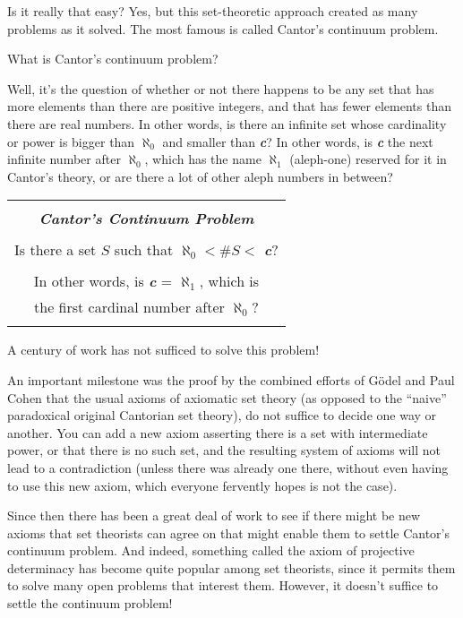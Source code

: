 \documentclass[12pt]{book}
\begin{document}
Is it really that easy?  Yes, but this set-theoretic approach 
created as many problems as it solved.  
The most famous is called Cantor's continuum problem.
 
What is Cantor's continuum problem?
 
Well, it's the question of whether or not there happens to be any set that has
more elements than there are positive integers, 
and that has fewer elements than there are real numbers.
In other words, is there an infinite set whose cardinality or power 
is bigger than $\aleph_0$ 
and smaller than \textbf{\emph{c}}?  In other words, is \textbf{\emph{c}} the next
infinite number after $\aleph_0$, which has the name 
$\aleph_1$
(aleph-one) reserved for it in Cantor's theory,
or are there a lot of other aleph numbers in between?
 
\begin{center}
\begin{tabular}{|c|}
\hline
\\
\textbf{\emph{\large Cantor's Continuum Problem}}
\\ \\
Is there a set $S$ such that $\aleph_0 < \#S <$ \textbf{\emph{c}}?
\\ \\
In other words, is \textbf{\emph{c}} = $\aleph_1$, which is
\\
the first cardinal number after $\aleph_0$?
\\
\\
\hline
\end{tabular}
\end{center}
 
A century of work has not sufficed to solve this problem!
 
An important milestone was the proof by the combined efforts of
G\"odel and Paul Cohen that the
usual axioms of axiomatic set theory (as opposed to the ``naive''
paradoxical original Cantorian set theory), do 
not suffice to decide one way or another. You can add
a new axiom asserting there is a set with intermediate power, or that there is no
such set, and the resulting system of axioms will not lead to a contradiction
(unless there was already one there, without even having to use this new axiom, 
which everyone fervently hopes is not the case).
 
Since then there has been a great deal of work to see if there might be new axioms
that set theorists can agree on that might enable them to settle Cantor's continuum problem.
And indeed, something called the axiom of projective determinacy has become quite
popular among set theorists, since it permits them to solve many open problems that interest them.
However, it doesn't suffice to settle the continuum problem!
 
\end{document}

